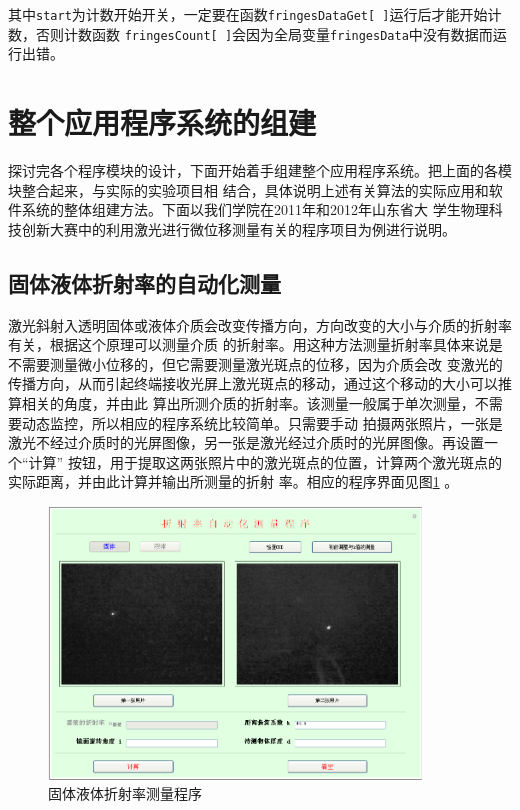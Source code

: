 \documentclass[UTF8,a4paper,12pt]{article}
\begin{document}
其中\verb|start|为计数开始开关，一定要在函数\verb|fringesDataGet[ ]|运行后才能开始计数，否则计数函数
\verb|fringesCount[ ]|会因为全局变量\verb|fringesData|中没有数据而运行出错。

\section{整个应用程序系统的组建}

探讨完各个程序模块的设计，下面开始着手组建整个应用程序系统。把上面的各模块整合起来，与实际的实验项目相
结合，具体说明上述有关算法的实际应用和软件系统的整体组建方法。下面以我们学院在2011年和2012年山东省大
学生物理科技创新大赛中的利用激光进行微位移测量有关的程序项目为例进行说明。

\subsection{固体液体折射率的自动化测量}

激光斜射入透明固体或液体介质会改变传播方向，方向改变的大小与介质的折射率有关，根据这个原理可以测量介质
的折射率。用这种方法测量折射率具体来说是不需要测量微小位移的，但它需要测量激光斑点的位移，因为介质会改
变激光的传播方向，从而引起终端接收光屏上激光斑点的移动，通过这个移动的大小可以推算相关的角度，并由此
算出所测介质的折射率。该测量一般属于单次测量，不需要动态监控，所以相应的程序系统比较简单。只需要手动
拍摄两张照片，一张是激光不经过介质时的光屏图像，另一张是激光经过介质时的光屏图像。再设置一个``计算''
按钮，用于提取这两张照片中的激光斑点的位置，计算两个激光斑点的实际距离，并由此计算并输出所测量的折射
率。相应的程序界面见图\;\ref{fig:zheshelv} 。

\begin{figure}[htbp]
\centering
\includegraphics[width=99mm]{image/zheshelv.pdf}
\caption{固体液体折射率测量程序}\label{fig:zheshelv}
\end{figure}
\end{document}
